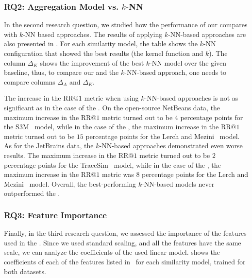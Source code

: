 \subsubsection{RQ2: Aggregation Model vs. $k$-NN}

In the second research question, we studied how the performance of our \ag compares with $k$-NN based approaches.
The results of applying $k$-NN-based approaches are also presented in . For each similarity model, the table shows the $k$-NN configuration that showed the best results (the kernel function and $k$).
The column $\Delta_{K}$ shows the improvement of the best $k$-NN model over the given baseline, thus, to compare our \ag and the $k$-NN-based approach, one needs to compare columns $\Delta_{A}$ and $\Delta_{K}$. 

The increase in the $\mathrm{RR} @ 1$ metric when using $k$-NN-based approaches is not as significant as in the case of the \ag. 
On the open-source NetBeans data, the maximum increase in the $\mathrm{RR} @ 1$ metric turned out to be $4$ percentage points for the S3M~\cite{s3m} model, while in the case of the \ag, the maximum increase in the $\mathrm{RR} @ 1$ metric turned out to be $15$ percentage points for the Lerch and Mezini~\cite{lerch} model.
As for the JetBrains data, the $k$-NN-based approaches demonstrated even worse results.
The maximum increase in the $\mathrm{RR} @ 1$ metric turned out to be $2$ percentage points for the TraceSim~\cite{tracesim} model, while in the case of the \ag, the maximum increase in the $\mathrm{RR}@1$ metric was $8$ percentage points for the Lerch and Mezini~\cite{lerch} model.
Overall, the best-performing $k$-NN-based models never outperformed the \ag.


\subsubsection{RQ3: Feature Importance}
Finally, in the third research question, we assessed the importance of the features used in the \ag. Since we used standard scaling, and all the features have the same scale, we can analyze the coefficients of the used linear model.  shows the coefficients of each of the features listed in~ for each similarity model, trained for both datasets.

